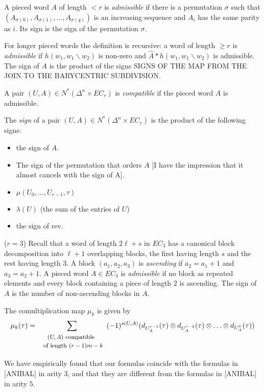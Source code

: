 \begin{definition} A pieced word $A$ of length $<r$ is \emph{admissible} if there is a permutation $\sigma$ such that $(A_{\sigma(0)},A_{\sigma(1)},\ldots,A_{\sigma(q)})$ is an increasing sequence and $A_{i}$ has the same parity as $i$. Its sign is the sign of the permutation $\sigma$.

For longer pieced words the definition is recursive: a word of length $\geq r$ is \emph{admissible} if $h(w_1,w_1\smallsetminus w_2)$ is non-zero and $\hat{A}*h(w_1,w_1\smallsetminus w_2)$ is admissible. The sign of $A$ is the product of the signs SIGNS OF THE MAP FROM THE JOIN TO THE BARYCENTRIC SUBDIVISION.
\end{definition}
\begin{definition}
    A pair $(U,A)\in N^*(\Delta^n\times EC_r)$ is \emph{compatible} if the pieced word $A$ is admissible.
\end{definition}
\begin{definition}
    The \emph{sign} of a pair $(U,A)\in N^*(\Delta^n\times EC_r)$ is the product of the following signs:
    \begin{itemize}
    \item the sign of $A$.
    \item The sign of the permutation that orders $A$ [I have the impression that it almost cancels with the sign of A].
    \item $\mu(U_0,\ldots,U_{r-1},\tau)$
    \item $\lambda(U)$ (the sum of the entries of $U$)
    \item the sign of $\mathrm{rev}$.
\end{itemize}
\end{definition}
\begin{example}
    ($r=3$) Recall that a word of length $2\ell+s$ in $EC_3$ has a canonical block decomposition into $\ell+1$ overlapping blocks, the first having length $s$ and the rest having length $3$. A block $(a_1,a_2,a_3)$ is \emph{ascending} if $a_2=a_1+1$ and $a_3=a_2+1$. A pieced word $A\in EC_3$ is \emph{admissible} if no block as repeated elements and every block containing a piece of length $2$ is ascending. The sign of $A$ is the number of non-ascending blocks in $A$.
\end{example}
The comultiplication map $\mu_k$ is given by
\[\mu_k(\tau) = \sum_{\begin{array}{c}\text{\footnotesize $(U,A)$ compatible }\\ \text{ \footnotesize of length $(r-1)m-k$}\end{array}} (-1)^{s(U,A)}(d_{U^{r-1}_{A}}(\tau)\otimes d_{U^{r-2}_{A}}(\tau)\otimes \ldots \otimes d_{U^{0}_{A}}(\tau) )\]

We have empirically found that our formulas coincide with the formulas in [ANIBAL] in arity $3$, and that they are different from the formulas in [ANIBAL] in arity $5$.
